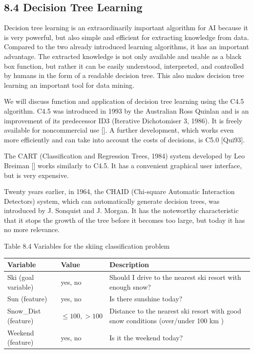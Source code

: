 \documentclass[10pt]{article}
\begin{document}
\subsection*{8.4 Decision Tree Learning}
Decision tree learning is an extraordinarily important algorithm for AI because it is very powerful, but also simple and efficient for extracting knowledge from data. Compared to the two already introduced learning algorithms, it has an important advantage. The extracted knowledge is not only available and usable as a black box function, but rather it can be easily understood, interpreted, and controlled by humans in the form of a readable decision tree. This also makes decision tree learning an important tool for data mining.

We will discuss function and application of decision tree learning using the C4.5 algorithm. C4.5 was introduced in 1993 by the Australian Ross Quinlan and is an improvement of its predecessor ID3 (Iterative Dichotomiser 3, 1986). It is freely available for noncommercial use [\cite{quinlan1993c45}]. A further development, which works even more efficiently and can take into account the costs of decisions, is C5.0 [Qui93].

The CART (Classification and Regression Trees, 1984) system developed by Leo Breiman [\cite{breiman1984cart}] works similarly to C4.5. It has a convenient graphical user interface, but is very expensive.

Twenty years earlier, in 1964, the CHAID (Chi-square Automatic Interaction Detectors) system, which can automatically generate decision trees, was introduced by J. Sonquist and J. Morgan. It has the noteworthy characteristic that it stops the growth of the tree before it becomes too large, but today it has no more relevance.

Table 8.4 Variables for the skiing classification problem

\begin{center}
\begin{tabular}{|l|l|l|}
\hline
Variable & Value & Description \\
\hline
Ski (goal variable) & yes, no & Should I drive to the nearest ski resort with enough snow? \\
\hline
Sun (feature) & yes, no & Is there sunshine today? \\
\hline
Snow\_Dist (feature) & $\leq 100,>100$ & Distance to the nearest ski resort with good snow conditions (over/under 100 km ) \\
\hline
Weekend (feature) & yes, no & Is it the weekend today? \\
\hline
\end{tabular}
\end{center}
\end{document}
